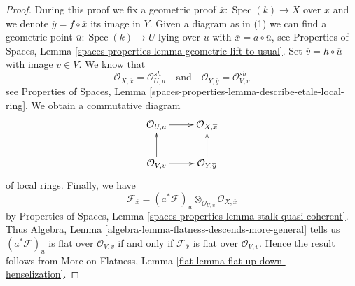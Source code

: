 \documentclass[10pt,a4paper]{amsart}
\theoremstyle{plain}
\theoremstyle{definition}
\theoremstyle{remark}
\numberwithin{equation}{subsection}
\def\Spec{\mathop{\mathrm{Spec}}}
\begin{document}
\begin{proof}
During this proof we fix a geometric proof
$\overline{x} : \Spec(k) \to X$ over $x$ and
we denote $\overline{y} = f \circ \overline{x}$ its image in $Y$.
Given a diagram as in (1) we can find a geometric point
$\overline{u} : \Spec(k) \to U$ lying over $u$ with
$\overline{x} = a \circ \overline{u}$, see
Properties of Spaces, Lemma
\ref{spaces-properties-lemma-geometric-lift-to-usual}.
Set $\overline{v} = h \circ \overline{u}$ with image $v \in V$.
We know that
$$
\mathcal{O}_{X, \overline{x}} = \mathcal{O}_{U, u}^{sh}
\quad\text{and}\quad
\mathcal{O}_{Y, \overline{y}} = \mathcal{O}_{V, v}^{sh}
$$
see
Properties of Spaces, Lemma
\ref{spaces-properties-lemma-describe-etale-local-ring}.
We obtain a commutative diagram
$$
\xymatrix{
\mathcal{O}_{U, u} \ar[r] &
\mathcal{O}_{X, \overline{x}} \\
\mathcal{O}_{V, v} \ar[u] \ar[r] &
\mathcal{O}_{Y, \overline{y}} \ar[u]
}
$$
of local rings. Finally, we have
$$
\mathcal{F}_{\overline{x}} =
(a^*\mathcal{F})_u \otimes_{\mathcal{O}_{U, u}}
\mathcal{O}_{X, \overline{x}}
$$
by
Properties of Spaces, Lemma \ref{spaces-properties-lemma-stalk-quasi-coherent}.
Thus
Algebra, Lemma \ref{algebra-lemma-flatness-descends-more-general}
tells us $(a^*\mathcal{F})_u$ is flat over $\mathcal{O}_{V, v}$
if and only if $\mathcal{F}_{\overline{x}}$ is flat over $\mathcal{O}_{V, v}$.
Hence the result follows from
More on Flatness, Lemma \ref{flat-lemma-flat-up-down-henselization}.
\end{proof}
\end{document}

